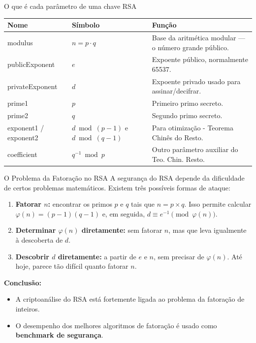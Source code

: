\begin{frame}{O que é cada parâmetro de uma chave RSA}
  \footnotesize
  \begin{table}[h]
    \centering
    \begin{tabular}{lll}
      \toprule
      \textbf{Nome}         & \textbf{Símbolo}                  & \textbf{Função}                                       \\
      \midrule
      modulus               & $n = p \cdot q$                   & Base da aritmética modular — o número grande público. \\
      publicExponent        & $e$                               & Expoente público, normalmente 65537.                  \\
      privateExponent       & $d$                               & Expoente privado usado para assinar/decifrar.         \\
      prime1                & $p$                               & Primeiro primo secreto.                               \\
      prime2                & $q$                               & Segundo primo secreto.                                \\
      exponent1 / exponent2 & $d \bmod (p-1)$ e $d \bmod (q-1)$ & Para otimização - Teorema Chinês do Resto.            \\
      coefficient           & $q^{-1} \bmod p$                  & Outro parâmetro auxiliar do Teo. Chin. Resto.         \\
      \bottomrule
    \end{tabular}
  \end{table}
\end{frame}

\begin{frame}{O Problema da Fatoração no RSA}
  A segurança do RSA depende da dificuldade de certos problemas matemáticos.
  Existem três possíveis formas de ataque:

  \begin{enumerate}
    \item \textbf{Fatorar $n$:} encontrar os primos $p$ e $q$ tais que $n = p \times q$.
          Isso permite calcular $\varphi(n) = (p-1)(q-1)$ e, em seguida, $d \equiv e^{-1} \pmod{\varphi(n)}$.
    \item \textbf{Determinar $\varphi(n)$ diretamente:} sem fatorar $n$, mas que leva igualmente à descoberta de $d$.
    \item \textbf{Descobrir $d$ diretamente:} a partir de $e$ e $n$, sem precisar de $\varphi(n)$.
          Até hoje, parece tão difícil quanto fatorar $n$.
  \end{enumerate}

  \medskip
  \textbf{Conclusão:}
  \begin{itemize}
    \item A criptoanálise do RSA está fortemente ligada ao problema da \alert{fatoração de inteiros}.
    \item O desempenho dos melhores algoritmos de fatoração é usado como \textbf{benchmark de segurança}.
  \end{itemize}
\end{frame}

